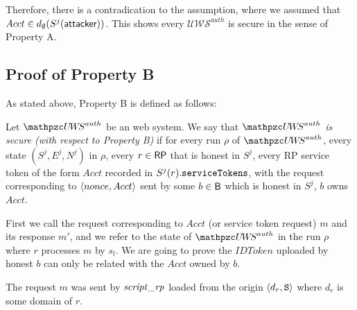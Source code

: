   Therefore, there is a contradication to the assumption, where we assumed that 
  $Acct \in d_{\emptyset}(S^j(\mathsf{attacker}))$. 
  This shows every $\mathcal{U\!W\!S}^{auth}$ is secure in the sense of Property A.
  
  \subsection{Proof of Property B}
  As stated above, Property B is defined as follows:
  \begin{definition}\label{def:B}
    Let $\uppressoauthwebsystem$ be an \uppresso web system. We say that
    \emph{$\uppressoauthwebsystem$ is secure (with respect to Property B)} if
    for every run $\rho$ of $\uppressoauthwebsystem$, every state $(S^j, E^j, N^j)$
    in $\rho$, every $r\in \mathsf{RP}$ that is honest in $S^j$, 
    every RP service token of the form $Acct$ recorded in
    $S^j(r).\mathtt{serviceTokens}$, with the request corresponding to
    $\langle {{}nonce, Acct} \rangle$ sent by some $b\in \mathsf{B}$ which is honest in $S^j$, $b$ owns $Acct$.
  \end{definition}
  
  First we call the request corresponding to $Acct$ (or service token request) $m$ and
  its response $m'$, and we refer to the state of $\uppressoauthwebsystem$ in the run 
  $\rho$ where $r$ processes $m$ by $s_l$. We are going to prove the $IDToken$ uploaded 
  by honest $b$ can only be related with the $Acct$ owned by $b$.
  
  
  \begin{lemma}\label{lemma:request-m-is-from-script-rp}
    The request $m$ was sent by $\mathit{script\_rp}$ loaded from 
    the origin $\langle d_r, \mathtt{S}\rangle$ where $d_r$ is some domain of 
    $r$.
  \end{lemma}
  
